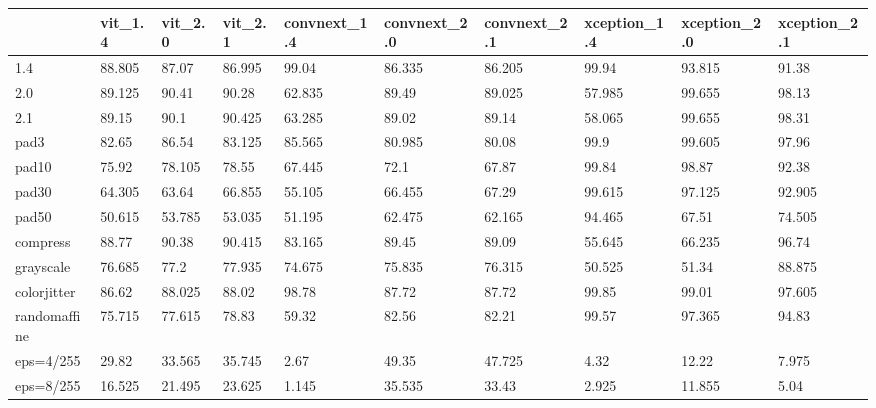 \begin{tabular}{llllllllll}
\toprule
{} & vit\_1.4 & vit\_2.0 & vit\_2.1 & convnext\_1.4 & convnext\_2.0 & convnext\_2.1 & xception\_1.4 & xception\_2.0 & xception\_2.1 \\
\midrule
1.4          &  88.805 &   87.07 &  86.995 &        99.04 &       86.335 &       86.205 &        99.94 &       93.815 &        91.38 \\
2.0          &  89.125 &   90.41 &   90.28 &       62.835 &        89.49 &       89.025 &       57.985 &       99.655 &        98.13 \\
2.1          &   89.15 &    90.1 &  90.425 &       63.285 &        89.02 &        89.14 &       58.065 &       99.655 &        98.31 \\
pad3         &   82.65 &   86.54 &  83.125 &       85.565 &       80.985 &        80.08 &         99.9 &       99.605 &        97.96 \\
pad10        &   75.92 &  78.105 &   78.55 &       67.445 &         72.1 &        67.87 &        99.84 &        98.87 &        92.38 \\
pad30        &  64.305 &   63.64 &  66.855 &       55.105 &       66.455 &        67.29 &       99.615 &       97.125 &       92.905 \\
pad50        &  50.615 &  53.785 &  53.035 &       51.195 &       62.475 &       62.165 &       94.465 &        67.51 &       74.505 \\
compress     &   88.77 &   90.38 &  90.415 &       83.165 &        89.45 &        89.09 &       55.645 &       66.235 &        96.74 \\
grayscale    &  76.685 &    77.2 &  77.935 &       74.675 &       75.835 &       76.315 &       50.525 &        51.34 &       88.875 \\
colorjitter  &   86.62 &  88.025 &   88.02 &        98.78 &        87.72 &        87.72 &        99.85 &        99.01 &       97.605 \\
randomaffine &  75.715 &  77.615 &   78.83 &        59.32 &        82.56 &        82.21 &        99.57 &       97.365 &        94.83 \\
eps=4/255    &   29.82 &  33.565 &  35.745 &         2.67 &        49.35 &       47.725 &         4.32 &        12.22 &        7.975 \\
eps=8/255    &  16.525 &  21.495 &  23.625 &        1.145 &       35.535 &        33.43 &        2.925 &       11.855 &         5.04 \\
\bottomrule
\end{tabular}
